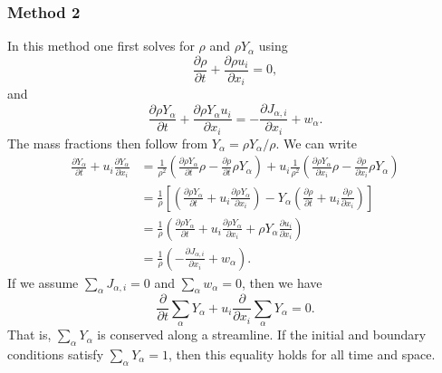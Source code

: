 \documentclass[oneside,a4paper,11pt]{report}
\begin{document}
\subsubsection{Method 2}
In this method one first solves for $\rho$ and $\rho Y_\alpha$ using 
\begin{equation*}
    \frac{\partial \rho}{\partial t} + \frac{\partial \rho u_i}{\partial x_i} = 0,
\end{equation*}
and    
\begin{equation*}
    \frac{\partial\rho Y_\alpha}{\partial t}+\frac{\partial \rho Y_\alpha u_i}{\partial x_i} = -\frac{\partial J_{\alpha,i}}{\partial x_i} + w_\alpha.
\end{equation*}
The mass fractions then follow from $Y_\alpha = \rho Y_\alpha / \rho$. We can write
\begin{align*}
    \frac{\partial Y_\alpha}{\partial t} + u_i \frac{\partial Y_\alpha}{\partial x_i} &= \frac{1}{\rho^2} \left( \frac{\partial \rho Y_\alpha}{\partial t} \rho - \frac{\partial \rho}{\partial t} \rho Y_\alpha \right) + u_i \frac{1}{\rho^2} \left( \frac{\partial \rho Y_\alpha}{\partial x_i} \rho - \frac{\partial \rho}{\partial x_i} \rho Y_\alpha \right)\\
    &= \frac{1}{\rho} \left[ \left( \frac{\partial \rho Y_\alpha}{\partial t} + u_i \frac{\partial \rho Y_\alpha}{\partial x_i} \right) - Y_\alpha \left( \frac{\partial \rho}{\partial t} + u_i \frac{\partial \rho}{\partial x_i} \right) \right] \\
    &= \frac{1}{\rho} \left( \frac{\partial \rho Y_\alpha}{\partial t} + u_i \frac{\partial \rho Y_\alpha}{\partial x_i} + \rho Y_\alpha \frac{\partial u_i}{\partial x_i} \right) \\
    &= \frac{1}{\rho} \left( -\frac{\partial J_{\alpha,i}}{\partial x_i} + w_\alpha \right).
\end{align*}
If we assume $\sum_\alpha J_{\alpha,i} = 0$ and $\sum_\alpha w_\alpha = 0$, then we have
\begin{equation}
    \frac{\partial}{\partial t} \sum_\alpha Y_\alpha + u_i \frac{\partial}{\partial x_i} \sum_\alpha Y_\alpha = 0.
\end{equation} 
That is, $\sum_\alpha Y_\alpha$ is conserved along a streamline. If the initial and boundary conditions satisfy $\sum_\alpha Y_\alpha=1$, then this equality holds for all time and space.

\end{document}
